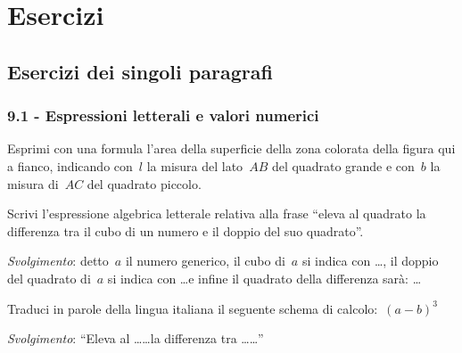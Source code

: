 \section{Esercizi}
\subsection{Esercizi dei singoli paragrafi}
\subsubsection*{9.1 - Espressioni letterali e valori numerici}

\begin{multicols}{2}
\begin{esercizio}[\Ast]
\label{ese:9.1}
Esprimi con una formula l'area della superficie della zona colorata della figura qui a fianco, %
indicando con~$l$ la misura del lato~$AB$ del quadrato grande e
con~$b$ la misura di~$AC$ del quadrato piccolo.
%
\begin{center}

\end{center}
\end{esercizio}
\end{multicols}

\begin{esercizio}[\Ast]
\label{ese:9.2}
Scrivi l'espressione algebrica letterale relativa alla frase ``eleva al quadrato la differenza tra il cubo di un
numero e il doppio del suo quadrato''.

\emph{Svolgimento}: detto~$a$ il numero generico, il cubo di~$a$ si indica con \ldots,
il doppio del quadrato di~$a$ si indica con \ldots e infine
il quadrato della differenza sarà: \ldots
\end{esercizio}

\begin{esercizio}
\label{ese:9.3}
Traduci in parole della lingua italiana il seguente schema di calcolo:~$(a-b)^{3}$

\emph{Svolgimento}: ``Eleva al \ldots\ldots la differenza tra \ldots\ldots''
\end{esercizio}

